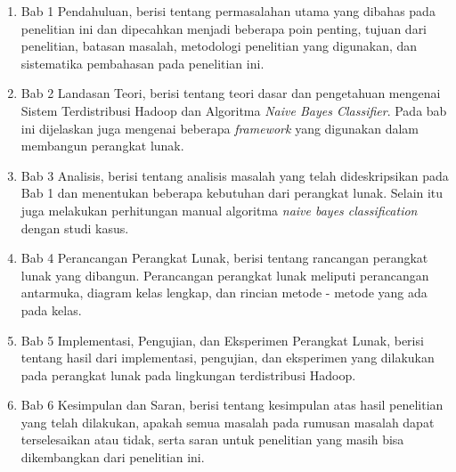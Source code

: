 \begin{enumerate}
	\item Bab 1 Pendahuluan, berisi tentang permasalahan utama yang dibahas pada penelitian ini dan dipecahkan menjadi beberapa poin penting, tujuan dari penelitian, batasan masalah, metodologi penelitian yang digunakan, dan sistematika pembahasan pada penelitian ini. 
	\item Bab 2 Landasan Teori, berisi tentang teori dasar dan pengetahuan mengenai Sistem Terdistribusi Hadoop dan Algoritma \textit{Naive Bayes Classifier}. Pada bab ini dijelaskan juga mengenai beberapa \textit{framework} yang digunakan dalam membangun perangkat lunak.
	\item Bab 3 Analisis, berisi tentang analisis masalah yang telah dideskripsikan pada Bab 1 dan menentukan beberapa kebutuhan dari perangkat lunak. Selain itu juga melakukan perhitungan manual algoritma \textit{naive bayes classification} dengan studi kasus.
	\item Bab 4 Perancangan Perangkat Lunak, berisi tentang rancangan perangkat lunak yang dibangun. Perancangan perangkat lunak meliputi perancangan antarmuka, diagram kelas lengkap, dan rincian metode - metode yang ada pada kelas.
	\item Bab 5 Implementasi, Pengujian, dan Eksperimen Perangkat Lunak, berisi tentang hasil dari implementasi, pengujian, dan eksperimen yang dilakukan pada perangkat lunak pada lingkungan terdistribusi Hadoop.
	\item Bab 6 Kesimpulan dan Saran, berisi tentang kesimpulan atas hasil penelitian yang telah dilakukan, apakah semua masalah pada rumusan masalah dapat terselesaikan atau tidak, serta saran untuk penelitian yang masih bisa dikembangkan dari penelitian ini.
\end{enumerate}

